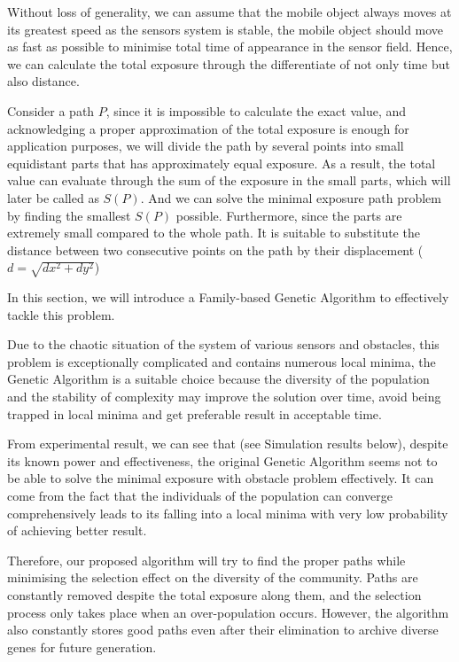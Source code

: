 \documentclass[review]{elsarticle}
\begin{document}

Without loss of generality, we can assume that the mobile object always moves at its greatest speed as the sensors system is stable, the mobile object should move as fast as possible to minimise total time of appearance in the sensor field. Hence, we can calculate the total exposure through the differentiate of not only time but also distance. %

Consider a path $P$, since it is impossible to calculate the exact value, and acknowledging a proper approximation of the total exposure is enough for application purposes, we will divide the path by several points into small equidistant parts that has approximately equal exposure. As a result, the total value can evaluate through the sum of the exposure in the small parts, which will later be called as $S(P)$. And we can solve the minimal exposure path problem by finding the smallest $S(P)$ possible. Furthermore, since the parts are extremely small compared to the whole path. It is suitable to substitute the distance between two consecutive points on the path by their displacement ($d = \sqrt{dx ^ 2 + dy ^ 2}$)

In this section, we will introduce a Family-based Genetic Algorithm to effectively tackle this problem.

Due to the chaotic situation of the system of various sensors and obstacles, this problem is exceptionally complicated and contains numerous local minima, the Genetic Algorithm is a suitable choice because the diversity of the population and the stability of complexity may improve the solution over time, avoid being trapped in local minima and get preferable result in acceptable time.

From experimental result, we can see that (see Simulation results below), despite its known power and effectiveness, the original Genetic Algorithm seems not to be able to solve the minimal exposure with obstacle problem effectively. It can come from the fact that the individuals of the population can converge comprehensively leads to its falling into a local minima with very low probability of achieving better result.

Therefore, our proposed algorithm will try to find the proper paths while minimising the selection effect on the diversity of the community. Paths are constantly removed despite the total exposure along them, and the selection process only takes place when an over-population occurs. However, the algorithm also constantly stores good paths even after their elimination to archive diverse genes for future generation.
\end{document}
